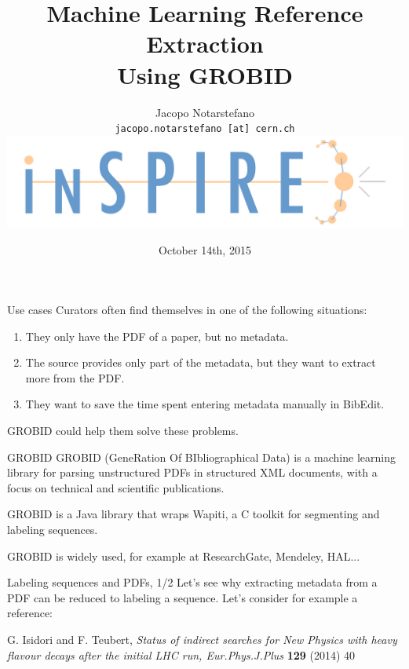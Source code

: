 \documentclass[10pt]{beamer}
\title{
  Machine Learning Reference Extraction\\
  Using GROBID
}
\author[Jacopo Notarstefano]{
  Jacopo Notarstefano\\
  \texttt{jacopo.notarstefano [at] cern.ch}\\
  \vspace{0.25cm}
  \includegraphics[scale=0.25]{tex/img/inspire}
}
\date{October 14th, 2015}
\newcommand{\cpp}{C\nolinebreak\hspace{-.05em}\raisebox{.4ex}{\tiny\bf +}\nolinebreak\hspace{-.10em}\raisebox{.4ex}{\tiny\bf +}}
\begin{document}
  \begin{frame}[plain]
    \titlepage
  \end{frame}

  \begin{frame}{Use cases}
    Curators often find themselves in one of the following situations:

    \vspace{0.25cm}

    \begin{enumerate}
      \item They only have the PDF of a paper, but no metadata.
      \item The source provides only part of the metadata, but they want to extract more from the PDF.
      \item They want to save the time spent entering metadata manually in BibEdit.
    \end{enumerate}

    \vspace{0.25cm}

    GROBID could help them solve these problems.
  \end{frame}

  \begin{frame}{GROBID}
    GROBID (GeneRation Of BIbliographical Data) is a machine learning library for parsing
    unstructured PDFs in structured XML documents, with a focus on technical and scientific
    publications.

    \vspace{0.5cm}

    GROBID is a Java library that wraps Wapiti, a \cpp\xspace toolkit for segmenting and
    labeling sequences.

    \vspace{0.5cm}

    GROBID is widely used, for example at ResearchGate, Mendeley, HAL...
  \end{frame}

  \begin{frame}{Labeling sequences and PDFs, 1/2}
    Let's see why extracting metadata from a PDF can be reduced to labeling a sequence.
    Let's consider for example a reference:

    \vspace{0.5cm}

    \begin{framed}
      G. Isidori and F. Teubert, \textit{Status of indirect searches for New Physics with heavy flavour decays after the initial LHC run, Eur.Phys.J.Plus} \textbf{129} (2014) 40
    \end{framed}
  \end{frame}
\end{document}

